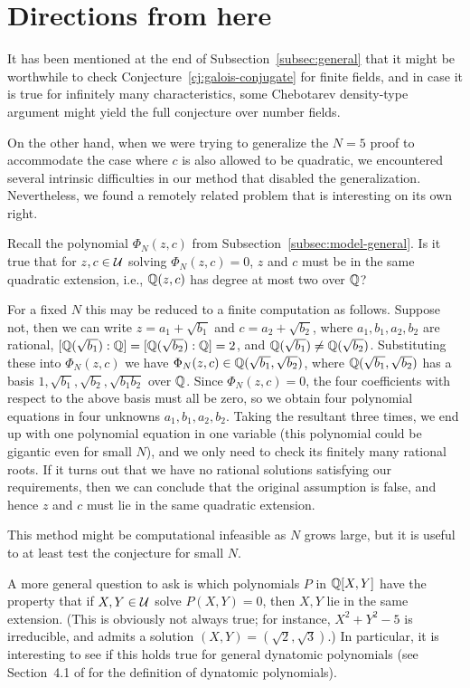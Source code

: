\section{Directions from here}
\label{sec:map}

It has been mentioned at the end of Subsection~\ref{subsec:general}
that it might be worthwhile to check
Conjecture~\ref{cj:galois-conjugate} for finite fields, and in case it
is true for infinitely many characteristics, some Chebotarev
density-type argument might yield the full conjecture over number
fields.

On the other hand, when we were trying to generalize the $N = 5$ proof
to accommodate the case where $c$ is also allowed to be quadratic, we
encountered several intrinsic difficulties in our method that disabled
the generalization. Nevertheless, we found a remotely related problem
that is interesting on its own right.

\begin{question}
  \label{q:z-c-same-extension}
  Recall the polynomial $\Phi_N(z, c)$ from
  Subsection~\ref{subsec:model-general}. Is it true that for $z, c \in
  \mathcal{U}$ solving $\Phi_N(z, c) = 0$, $z$ and $c$ must be in the same
  quadratic extension, i.e., $\mathbb{Q}(z, c)$ has degree at most two over
  $\mathbb{Q}$?
\end{question}

For a fixed $N$ this may be reduced to a finite computation as
follows. Suppose not, then we can write $z = a_1 + \sqrt{b_1}$ and $c
= a_2 + \sqrt{b_2}$, where $a_1, b_1, a_2, b_2$ are rational,
$[\mathbb{Q}(\sqrt{b_1}) : \mathbb{Q}] = [\mathbb{Q}(\sqrt{b_2}) : \mathbb{Q}] = 2$, and
$\mathbb{Q}(\sqrt{b_1}) \ne \mathbb{Q}(\sqrt{b_2})$. Substituting these into
$\Phi_N(z, c)$ we have $\Phi_N(z, c) \in \mathbb{Q}(\sqrt{b_1}, \sqrt{b_2})$,
where $\mathbb{Q}(\sqrt{b_1}, \sqrt{b_2})$ has a basis $1, \sqrt{b_1},
\sqrt{b_2}, \sqrt{b_1 b_2}$ over $\mathbb{Q}$. Since $\Phi_N(z, c) = 0$, the
four coefficients with respect to the above basis must all be zero, so
we obtain four polynomial equations in four unknowns $a_1, b_1, a_2,
b_2$. Taking the resultant three times, we end up with one polynomial
equation in one variable (this polynomial could be gigantic even for
small $N$), and we only need to check its finitely many rational
roots. If it turns out that we have no rational solutions satisfying
our requirements, then we can conclude that the original assumption is
false, and hence $z$ and $c$ must lie in the same quadratic extension.

This method might be computational infeasible as $N$ grows large, but
it is useful to at least test the conjecture for small $N$.

A more general question to ask is which polynomials $P$ in $\mathbb{Q}[X, Y]$
have the property that if $X, Y \in \mathcal{U}$ solve $P(X, Y) = 0$, then $X,
Y$ lie in the same extension. (This is obviously not always true; for
instance, $X^2 + Y^2 - 5$ is irreducible, and admits a solution $(X,
Y) = (\sqrt{2}, \sqrt{3})$.) In particular, it is interesting to see
if this holds true for general dynatomic polynomials (see Section~4.1
of \cite{MR2316407} for the definition of dynatomic polynomials).


